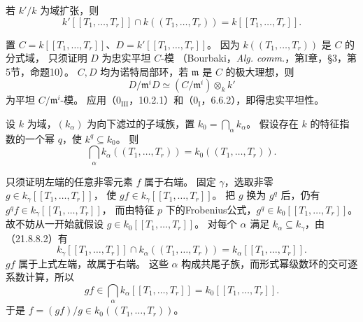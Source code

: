 若 $k'/k$ 为域扩张，则
\[
 k'[[T_1,\ldots,T_r]]\cap k((T_1,\ldots,T_r))=k[[T_1,\ldots,T_r]].
\]

\eproof
置 $C=k[[T_1,\ldots,T_r]]$、$D=k'[[T_1,\ldots,T_r]]$。
因为 $k((T_1,\ldots,T_r))$ 是 $C$ 的分式域，
只须证明 $D$ 为忠实平坦 $C$-模
（Bourbaki，\textit{Alg. comm.}，第I章，§3，第5节，命题10）。
$C,D$ 均为诺特局部环，若 $\mathfrak m$ 是 $C$ 的极大理想，则
\[
 D/\mathfrak m^iD\simeq(C/\mathfrak m^i)\otimes_kk'
\]
为平坦 $C/\mathfrak m^i$-模。
应用（$0_{\mathrm{III}}$，10.2.1）和（$0_{\mathrm I}$，6.6.2），即得忠实平坦性。
\finishproof

设 $k$ 为域，$(k_\alpha)$ 为向下滤过的子域族，置 $k_0=\bigcap_\alpha k_\alpha$。
假设存在 $k$ 的特征指数的一个幂 $q$，使 $k^q\subseteq k_0$。
则
\begin{equation}
 \bigcap_\alpha k_\alpha((T_1,\ldots,T_r))=k_0((T_1,\ldots,T_r)).
 \tag{21.8.8.4}
\end{equation}

\eproof
只须证明左端的任意非零元素 $f$ 属于右端。
固定 $\gamma$，选取非零 $g\in k_\gamma[[T_1,\ldots,T_r]]$，
使 $gf\in k_\gamma[[T_1,\ldots,T_r]]$。
把 $g$ 换为 $g^q$ 后，仍有 $g^qf\in k_\gamma[[T_1,\ldots,T_r]]$，
而由特征 $p$ 下的Frobenius公式，$g^q\in k_0[[T_1,\ldots,T_r]]$。
故不妨从一开始就假设 $g\in k_0[[T_1,\ldots,T_r]]$。
对每个 $\alpha$ 满足 $k_\alpha\subseteq k_\gamma$，由（21.8.8.2）有
\[
 k_\gamma[[T_1,\ldots,T_r]]\cap k_\alpha((T_1,\ldots,T_r))
 =k_\alpha[[T_1,\ldots,T_r]].
\]
$gf$ 属于上式左端，故属于右端。
这些 $\alpha$ 构成共尾子族，而形式幂级数环的交可逐系数计算，所以
\[
 gf\in\bigcap_\alpha k_\alpha[[T_1,\ldots,T_r]]
       =k_0[[T_1,\ldots,T_r]].
\]
于是 $f=(gf)/g\in k_0((T_1,\ldots,T_r))$。
\finishproof
